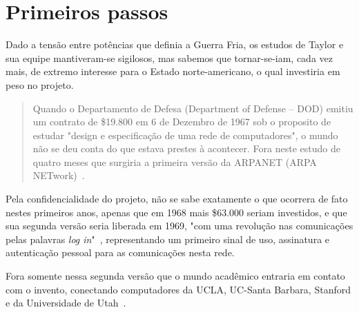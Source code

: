 \documentclass[conference]{IEEEtran}
\begin{document}
\section{Primeiros passos}
Dado a tensão entre potências que definia a Guerra Fria, os estudos de Taylor e sua equipe mantiveram-se sigilosos, mas sabemos que tornar-se-iam, cada vez mais, de extremo interesse para o Estado norte-americano, o qual investiria em peso no projeto.
  \begin{quote}
    Quando o Departamento de Defesa (Department of Defense -- DOD) emitiu um contrato de \$19.800 em
    6 de Dezembro de 1967 sob o proposito de estudar "design e especificação de uma
    rede de computadores", o mundo não se deu conta do que estava prestes à
    acontecer. Fora neste estudo de quatro meses que surgiria a primeira versão
    da ARPANET (ARPA NETwork)~\cite{internethistory}. 
  \end{quote}

  Pela confidencialidade do projeto, não se sabe exatamente o que ocorrera de
  fato nestes primeiros anos, apenas que em 1968 mais \$63.000 seriam investidos, e que sua segunda versão seria liberada em 1969,
   "com uma revolução nas comunicações pelas palavras
    \emph{log in}"~\cite{fromarpanet}, representando um primeiro sinal de uso, assinatura e autenticação pessoal para as comunicações nesta rede.
	
	

  Fora somente nessa segunda versão que o mundo acadêmico entraria em contato
  com o invento, conectando computadores da UCLA, UC-Santa Barbara, Stanford e
  da Universidade de Utah~\cite{fromarpanet}.
\end{document}
